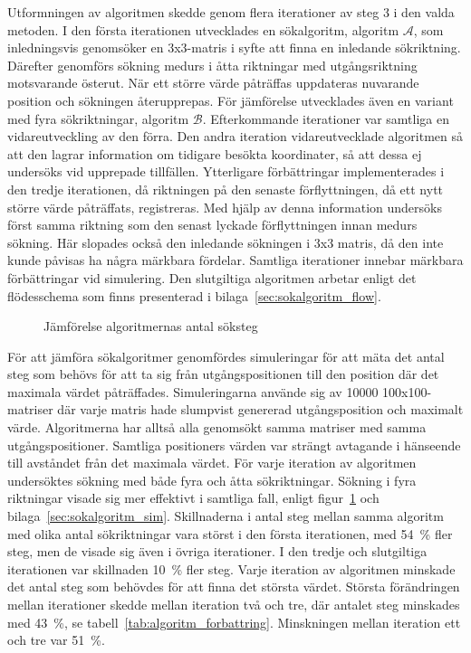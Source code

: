         Utformningen av algoritmen skedde genom flera iterationer av steg 3 i den valda metoden. I den första iterationen utvecklades en sökalgoritm, algoritm $\mathscr{A}$, som inledningsvis genomsöker en 3x3-matris i syfte att finna en inledande sökriktning. Därefter genomförs sökning medurs i åtta riktningar med utgångsriktning motsvarande österut. När ett större värde påträffas uppdateras nuvarande position och sökningen återupprepas. För jämförelse utvecklades även en variant med fyra sökriktningar, algoritm $\mathscr{B}$. Efterkommande iterationer var samtliga en vidareutveckling av den förra. Den andra iteration vidareutvecklade algoritmen så att den lagrar information om tidigare besökta koordinater, så att dessa ej undersöks vid upprepade tillfällen. Ytterligare förbättringar implementerades i den tredje iterationen, då riktningen på den senaste förflyttningen, då ett nytt större värde påträffats, registreras. Med hjälp av denna information undersöks först samma riktning som den senast lyckade förflyttningen innan medurs sökning. Här slopades också den inledande sökningen i 3x3 matris, då den inte kunde påvisas ha några märkbara fördelar. Samtliga iterationer innebar märkbara förbättringar vid simulering. Den slutgiltiga algoritmen arbetar enligt det flödesschema som finns presenterad i bilaga~\ref{sec:sokalgoritm_flow}. \bigskip

        \begin{figure}[hbt]
            
        \caption{\label{fig:algoritm_steg} Jämförelse algoritmernas antal söksteg}
        \end{figure}

        För att jämföra sökalgoritmer genomfördes simuleringar för att mäta det antal steg som behövs för att ta sig från utgångspositionen till den position där det maximala värdet påträffades. Simuleringarna använde sig av 10000 100x100-matriser där varje matris hade slumpvist genererad utgångsposition och maximalt värde. Algoritmerna har alltså alla genomsökt samma matriser med samma utgångspositioner. Samtliga positioners värden var strängt avtagande i hänseende till avståndet från det maximala värdet. För varje iteration av algoritmen undersöktes sökning med både fyra och åtta sökriktningar. Sökning i fyra riktningar visade sig mer effektivt i samtliga fall, enligt figur~\ref{fig:algoritm_steg} och bilaga~\ref{sec:sokalgoritm_sim}. Skillnaderna i antal steg mellan samma algoritm med olika antal sökriktningar vara störst i den första iterationen, med 54~\% fler steg, men de visade sig även i övriga iterationer. I den tredje och slutgiltiga iterationen var skillnaden 10~\% fler steg. Varje iteration av algoritmen minskade det antal steg som behövdes för att finna det största värdet. Största förändringen mellan iterationer skedde mellan iteration två och tre, där antalet steg minskades med 43~\%, se tabell~\ref{tab:algoritm_forbattring}. Minskningen mellan iteration ett och tre var 51~\%. \bigskip

